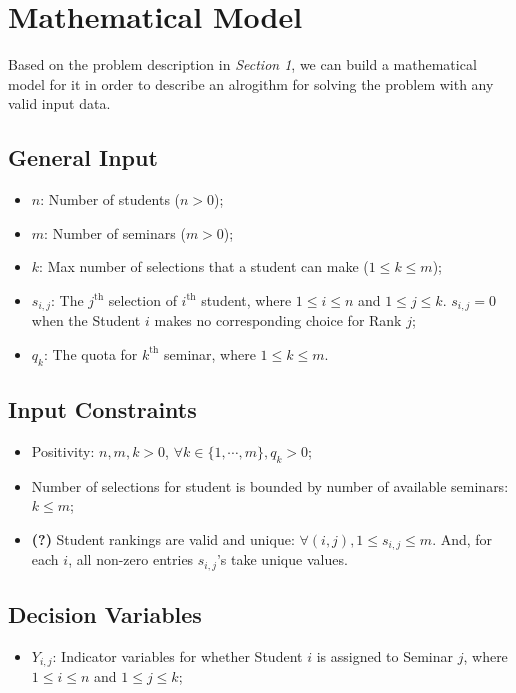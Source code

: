 \documentclass{article} %
\begin{document}
\section{Mathematical Model}
\par\qquad Based on the problem description in \emph{Section 1}, we can build a mathematical model for it in order to describe an alrogithm for solving the problem with any valid input data.

\subsection{General Input}
\begin{itemize}
    \item $n$: Number of students ($n > 0$);
    \item $m$: Number of seminars ($m > 0$);
    \item $k$: Max number of selections that a student can make ($1 \leq k \leq m$);
    \item $s_{i,j}$: The $j^{\text{th}}$ selection of $i^{\text{th}}$ student, where $1\leq i \leq n$ and $1\leq j \leq k$. $s_{i,j}=0$ when the Student $i$ makes no corresponding choice for Rank $j$;
    \item $q_k$: The quota for $k^{\text{th}}$ seminar, where $1\leq k \leq m$.
\end{itemize}

\subsection{Input Constraints}
\begin{itemize}
    \item Positivity: $n,m,k>0$, $\forall k\in\{1,\cdots,m\}, q_k>0$;
    \item Number of selections for student is bounded by number of available seminars: $k \leq m$;
    \item \textbf{(?)} Student rankings are valid and unique: $\forall (i,j), 1\leq s_{i,j} \leq m$. And, for each $i$, all non-zero entries $s_{i,j}$'s take unique values.
\end{itemize}

\subsection{Decision Variables}
\begin{itemize}
    \item $Y_{i,j}$: Indicator variables for whether Student $i$ is assigned to Seminar $j$, where $1\leq i \leq n$ and $1\leq j \leq k$;
\end{itemize}
\end{document}
